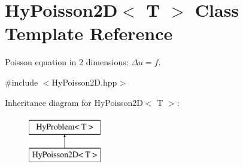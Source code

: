 \hypertarget{classHyPoisson2D}{
\section{HyPoisson2D$<$ T $>$ Class Template Reference}
\label{classHyPoisson2D}
}


Poisson equation in 2 dimensions: $ \Delta u = f $.  




{\ttfamily \#include $<$HyPoisson2D.hpp$>$}

Inheritance diagram for HyPoisson2D$<$ T $>$:\begin{figure}[H]
\begin{center}
\leavevmode
\includegraphics[height=2cm]{classHyPoisson2D}
\end{center}
\end{figure}
